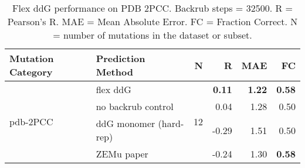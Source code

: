 \begin{table}
  \begin{tabular}{llrrrr}
\toprule
Mutation Category &       Prediction Method &   N &     R &  MAE &   FC \\
\midrule
 \multirow{ 4}{*}{pdb-2PCC} & flex ddG & \multirow{ 4}{*}{12} & \textbf{0.11} & \textbf{1.22} & \textbf{0.58}  \\
 & no backrub control & & 0.04 & 1.28 & 0.50  \\
 & ddG monomer (hard-rep) & & -0.29 & 1.51 & 0.50  \\
 & ZEMu paper & & -0.24 & 1.30 & \textbf{0.58}  \\
\bottomrule
\end{tabular}
  \caption[Flex ddG performance on PDB 2PCC]{
    Flex ddG performance on PDB 2PCC. Backrub steps = 32500. R = Pearson's R. MAE = Mean Absolute Error. FC = Fraction Correct. N = number of mutations in the dataset or subset.
  } \label{tab:table-pdb-2PCC}
\end{table}
